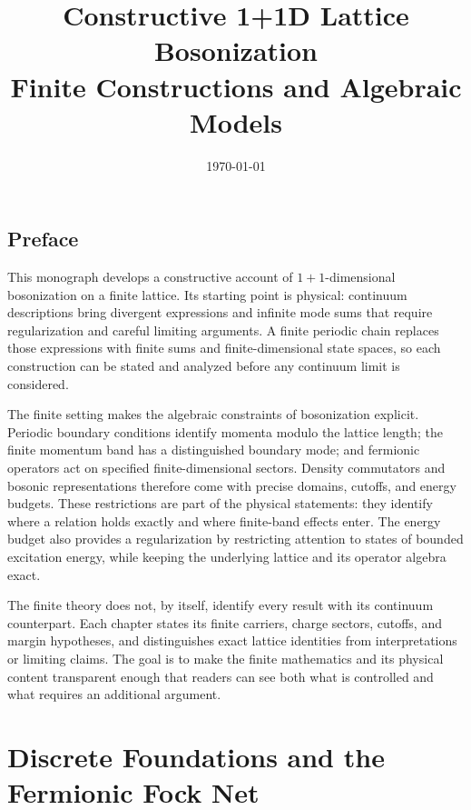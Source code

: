 \documentclass[11pt,a4paper,oneside]{book}
\title{\textbf{Constructive 1+1D Lattice Bosonization}\\
\Large Finite Constructions and Algebraic Models}
\author{}
\date{\today}
\begin{document}
\hypersetup{pageanchor=false}
\maketitle
\thispagestyle{empty}
\hypersetup{pageanchor=true}

\frontmatter

\chapter*{Preface}

This monograph develops a constructive account of $1+1$-dimensional bosonization on a finite lattice. Its starting point is physical: continuum descriptions bring divergent expressions and infinite mode sums that require regularization and careful limiting arguments. A finite periodic chain replaces those expressions with finite sums and finite-dimensional state spaces, so each construction can be stated and analyzed before any continuum limit is considered.

The finite setting makes the algebraic constraints of bosonization explicit. Periodic boundary conditions identify momenta modulo the lattice length; the finite momentum band has a distinguished boundary mode; and fermionic operators act on specified finite-dimensional sectors. Density commutators and bosonic representations therefore come with precise domains, cutoffs, and energy budgets. These restrictions are part of the physical statements: they identify where a relation holds exactly and where finite-band effects enter. The energy budget also provides a regularization by restricting attention to states of bounded excitation energy, while keeping the underlying lattice and its operator algebra exact.

The finite theory does not, by itself, identify every result with its continuum counterpart. Each chapter states its finite carriers, charge sectors, cutoffs, and margin hypotheses, and distinguishes exact lattice identities from interpretations or limiting claims. The goal is to make the finite mathematics and its physical content transparent enough that readers can see both what is controlled and what requires an additional argument.

\tableofcontents



\mainmatter

\part{Discrete Foundations and the Fermionic Fock Net}
\end{document}
